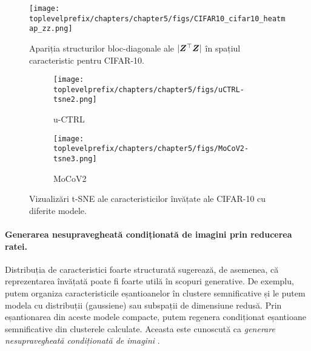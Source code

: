 \documentclass[../../book-main_ro.tex]{subfiles}
\begin{document}
\begin{figure}[t]
     \footnotesize
     \centering
    \texttt{[image: \\toplevelprefix/chapters/chapter5/figs/CIFAR10\_cifar10\_heatmap\_zz.png]}
    \caption{\small Apariția structurilor bloc-diagonale ale $|\bm{Z}^\top \bm{Z}|$ în spațiul caracteristic pentru CIFAR-10.}
    \label{fig:heatmap_z}
\end{figure}

\begin{figure}[ht!]
    \begin{subfigure}[t]{0.46\textwidth}
        \centering
        \texttt{[image: \\toplevelprefix/chapters/chapter5/figs/uCTRL-tsne2.png]}
        \caption{u-CTRL}
    \end{subfigure}
    \hfill
    \begin{subfigure}[t]{0.46\textwidth}
        \centering
        \texttt{[image: \\toplevelprefix/chapters/chapter5/figs/MoCoV2-tsne3.png]}
        \caption{MoCoV2}
    \end{subfigure}
    \caption{\small Vizualizări t-SNE ale caracteristicilor învățate ale CIFAR-10 cu diferite modele.}
    \label{fig:tsne}
\end{figure}

\paragraph{Generarea nesupravegheată condiționată de imagini prin reducerea ratei.}
Distribuția de caracteristici foarte structurată sugerează, de asemenea, că reprezentarea învățată poate fi foarte utilă în scopuri generative. De exemplu, putem organiza caracteristicile eșantioanelor în clustere semnificative și le putem modela cu distribuții (gaussiene) sau subspații de dimensiune redusă. Prin eșantionarea din aceste modele compacte, putem regenera condiționat eșantioane semnificative din clusterele calculate. Aceasta este cunoscută ca {\em generare nesupravegheată condiționată de imagini} \cite{hwang2021stein}.
\end{document}
